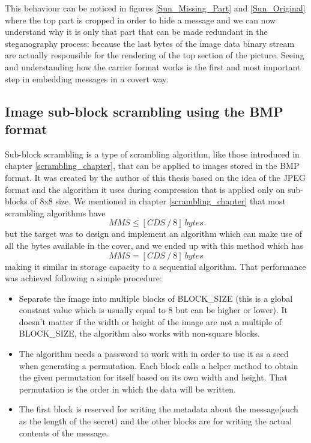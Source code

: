 This behaviour can be noticed in figures \ref{Sun_Missing_Part} and \ref{Sun_Original} where the top part is cropped in order to hide a message and we can now understand why it is only that part that can be made redundant in the steganography process: because the last bytes of the image data binary stream are actually responsible for the rendering of the top section of the picture. Seeing and understanding how the carrier format works is the first and most important step in embedding messages in a covert way.

\subsection{Image sub-block scrambling using the BMP format}
Sub-block scrambling is a type of scrambling algorithm, like those introduced in chapter \ref{scrambling_chapter}, that can be applied to images stored in the BMP format. It was created by the author of this thesis based on the idea of the JPEG format and the algorithm it uses during compression that is applied only on sub-blocks of 8x8 size. We mentioned in chapter \ref{scrambling_chapter} that most scrambling algorithms have \[ MMS \leq [CDS \ / \ 8] \ bytes \] but the target was to design and implement an algorithm which can make use of all the bytes available in the cover, and we ended up with this method which has 
\begin{equation} \label{eq:1}
MMS = [CDS \ / \ 8] \ bytes
\end{equation}
 making it similar in storage capacity to a sequential algorithm. That performance was achieved following a simple procedure:
\begin{itemize}
  \item Separate the image into multiple blocks of BLOCK\_SIZE (this is a global constant value which is usually equal to 8 but can be higher or lower). It doesn't matter if the width or height of the image are not a multiple of BLOCK\_SIZE, the algorithm also works with non-square blocks.
  \item The algorithm needs a password to work with in order to use it as a seed when generating a permutation. Each block calls a helper method to obtain the given permutation for itself based on its own width and height. That permutation is the order in which the data will be written.
  \item The first block is reserved for writing the metadata about the message(such as the length of the secret) and the other blocks are for writing the actual contents of the message.
\end{itemize}

